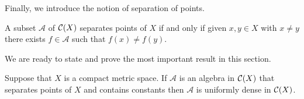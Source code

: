 Finally, we introduce the notion of separation of points.
\begin{definition}[separation on $\C(X)$]
A subset $\mathcal{A}$ of $\C(X)$ separates points of $X$ if and only if given $x, y \in X$ with $x \neq y$ there exists $f \in \mathcal{A}$ such that $f(x) \neq f(y)$.
\end{definition}

We are ready to state and prove the most important result in this section.

\begin{theorem}
\label{thm:anal:stone-weierstrass}
Suppose that $X$ is a compact metric space. If $\mathcal{A}$ is an algebra in $\C(X)$ that separates points of $X$ and contains constants then $\mathcal{A}$ is uniformly dense in $\C(X)$.
\end{theorem}
